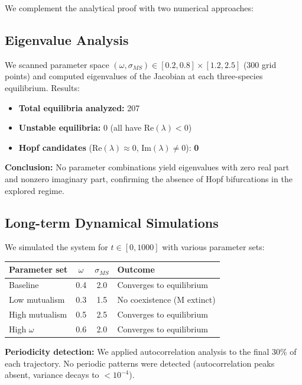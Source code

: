 \documentclass[11pt]{article}
\begin{document}
We complement the analytical proof with two numerical approaches:

\subsection{Eigenvalue Analysis}

We scanned parameter space $(\omega, \sigma_{MS}) \in [0.2, 0.8] \times [1.2, 2.5]$ (300 grid points) and computed eigenvalues of the Jacobian at each three-species equilibrium. Results:

\begin{itemize}
    \item \textbf{Total equilibria analyzed:} 207
    \item \textbf{Unstable equilibria:} 0 (all have $\text{Re}(\lambda) < 0$)
    \item \textbf{Hopf candidates} ($\text{Re}(\lambda) \approx 0$, $\text{Im}(\lambda) \neq 0$): \textbf{0}
\end{itemize}

\textbf{Conclusion:} No parameter combinations yield eigenvalues with zero real part and nonzero imaginary part, confirming the absence of Hopf bifurcations in the explored regime.

\subsection{Long-term Dynamical Simulations}

We simulated the system for $t \in [0, 1000]$ with various parameter sets:

\begin{center}
\begin{tabular}{lccl}
\hline
Parameter set & $\omega$ & $\sigma_{MS}$ & Outcome \\
\hline
Baseline & 0.4 & 2.0 & Converges to equilibrium \\
Low mutualism & 0.3 & 1.5 & No coexistence (M extinct) \\
High mutualism & 0.5 & 2.5 & Converges to equilibrium \\
High $\omega$ & 0.6 & 2.0 & Converges to equilibrium \\
\hline
\end{tabular}
\end{center}

\textbf{Periodicity detection:} We applied autocorrelation analysis to the final 30\% of each trajectory. No periodic patterns were detected (autocorrelation peaks absent, variance decays to $< 10^{-4}$).
\end{document}
